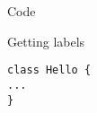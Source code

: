\documentclass{beamer}
\begin{document}
\begin{frame}[fragile]{Code}

\begin{block}{Getting labels}
\begin{lstlisting}[firstnumber=1, label=glabels, xleftmargin=10pt] 
class Hello {
...
}
\end{lstlisting}
\end{block}

\end{frame}
\end{document}
